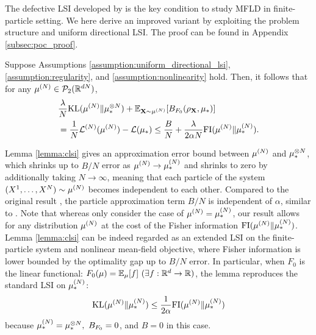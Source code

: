 The defective LSI developed by \citet{chen2022uniform} is the key condition to study MFLD in finite-particle setting. We here derive an improved variant by exploiting the problem structure and uniform directional LSI.
The proof can be found in Appendix \ref{subsec:poc_proof}.
\begin{lemma}\label{lemma:clsi} 
    Suppose Assumptions \ref{assumption:uniform_directional_lsi}, \ref{assumption:regularity}, and \ref{assumption:nonlinearity} hold. Then, it follows that for any $\pow[\mu,N]\in\cP_2(\bR^{dN})$,
    \begin{align*} 
        &\frac{\lambda}{N}\KL(\pow[\mu,N]\|\tensor[\mu,N]_*) + \bE_{\vX \sim \pow[\mu,N]}[B_{F_0}(\rho_\vX,\mu_*)] \\
        &=
        \frac{1}{N}\pow[\cL,N](\pow[\mu,N]) - \cL(\mu_*) 
        \leq 
        \frac{B}{N} 
        + \frac{\lambda}{2\alpha N} \FI(\pow[\mu,N]\|\pow[\mu,N]_*).
    \end{align*}
\end{lemma}

Lemma \ref{lemma:clsi} gives an approximation error bound between $\pow[\mu,N]$ and $\tensor[\mu,N]_*$, which shrinks up to $B/N$ error as $\pow[\mu,N] \to \pow[\mu,N]_*$ and shrinks to zero by additionally taking $N\to \infty$, meaning that each particle of the system $(X^1,\ldots,X^N)\sim\pow[\mu,N]$ becomes independent to each other. Compared to the original result \cite{chen2022uniform}, the particle approximation term $B/N$ is independent of $\alpha$, similar to \citet{nitanda2024improved}.
Note that whereas \citet{nitanda2024improved} only consider the case of $\pow[\mu,N]=\pow[\mu,N]_*$, our result allows for any distribution $\pow[\mu,N]$ at the cost of the Fisher information $\FI(\pow[\mu,N]\|\pow[\mu,N]_*)$. %
Lemma \ref{lemma:clsi} can be indeed regarded as an extended LSI on the finite-particle system and nonlinear mean-field objective, where Fisher information is lower bounded by the optimality gap up to $B/N$ error. In particular, when $F_0$ is the linear functional: $F_0(\mu)= \mathbb{E}_\mu[f]~(\exists f: \mathbb{R}^d \to \mathbb{R})$, the lemma reproduces the standard LSI on $\pow[\mu,N]_*$: 
\begin{equation*}
    \KL(\pow[\mu,N]\|\pow[\mu,N]_*) \leq \frac{1}{2\alpha}\FI(\pow[\mu,N]\|\pow[\mu,N]_*)
\end{equation*}
because $\pow[\mu,N]_* = \tensor[\mu,N]_*,~B_{F_0}=0$, and $B=0$ in this case. 

